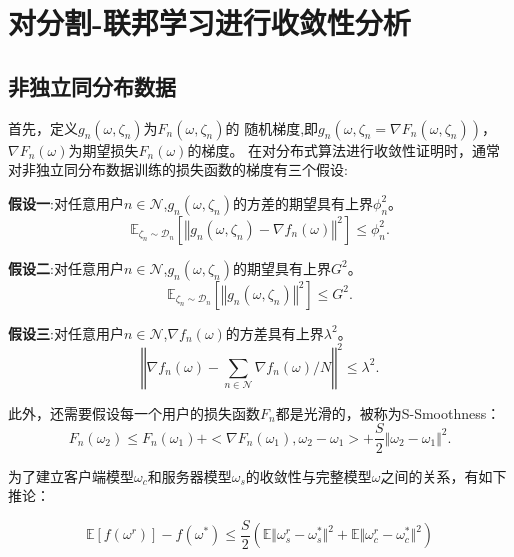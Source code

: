 \section{对分割-联邦学习进行收敛性分析}
\subsection{非独立同分布数据}
首先，定义$g_n(\omega,\zeta_n)$为$F_n(\omega,\zeta_n)$的
随机梯度,即$g_n(\omega,\zeta_n=\nabla F_n(\omega,\zeta_n))$，$\nabla F_n(\omega)$为期望损失$F_n(\omega)$的梯度。
在对分布式算法进行收敛性证明时，通常对非独立同分布数据训练的损失函数的梯度有三个假设\cite{li2019convergence}:

\noindent \textbf{假设一}:对任意用户$n\in \mathcal{N}$,$g_n(\omega,\zeta_n)$的方差的期望具有上界$\phi_n^2$。
\begin{equation}\label{j1}
\mathbb{E}_{\zeta_n\sim \mathcal{D}_n}\left[\left\Vert g_n\left(\omega,\zeta_n\right) - \nabla f_n\left(\omega\right) \right\Vert^2 \right] \leq \phi_n^2.
\end{equation}

\noindent \textbf{假设二}:对任意用户$n\in \mathcal{N}$,$g_n(\omega,\zeta_n)$的期望具有上界$G^2$。
\begin{equation}\label{j2}
\mathbb{E}_{\zeta_n\sim \mathcal{D}_n}\left[\left\Vert g_n\left(\omega, \zeta_n\right) \right\Vert^2\right] \leq G^2. 
\end{equation}

\noindent \textbf{假设三}:对任意用户$n\in \mathcal{N}$,$\nabla f_n(\omega)$的方差具有上界$\lambda^2$。
\begin{equation}
\textstyle \left\Vert \nabla f_n\left(\omega\right)- \sum_{n\in\mathcal{N}}\nabla f_n(\omega) /N \right\Vert^2 \le \lambda^2.
\label{j3}
\end{equation}

此外，还需要假设每一个用户的损失函数$F_n$都是光滑的，被称为S-Smoothness：
\begin{equation}
F_n(\omega_2)\leq F_n(\omega_1)+<\nabla F_n(\omega_1),\omega_2-\omega_1>+\frac{S}{2}\Vert\omega_2-\omega_1\Vert^2.
\end{equation}

为了建立客户端模型$\omega_c$和服务器模型$\omega_s$的收敛性与完整模型$\omega$之间的关系，有如下推论：

\begin{equation}
\mathbb{E}\left[f\left(\omega^r\right)\right]-f\left(\omega^*\right) \leq \frac{S}{2}\left(\mathbb{E}\Vert
\omega_s^r-\omega_s^*\Vert^2+\mathbb{E}\Vert\omega_c^r-\omega_c^*\Vert^2\right) 
\end{equation}

